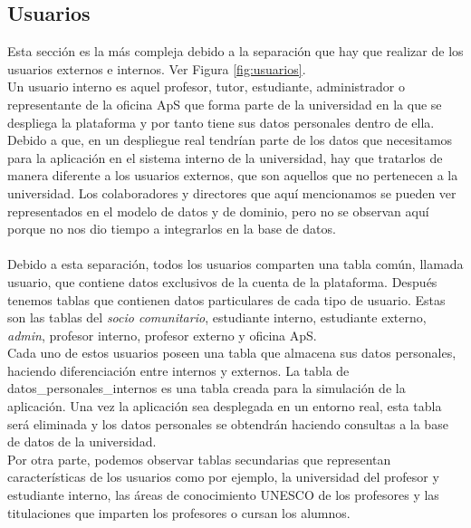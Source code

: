 \documentclass[11pt]{book}
\begin{document}
	\subsection{Usuarios}
	Esta sección es la más compleja debido a la separación que hay que realizar de los usuarios externos e internos. Ver Figura \ref{fig:usuarios}.\\
	Un usuario interno es aquel profesor, tutor, estudiante, administrador o representante de la oficina ApS que forma parte de la universidad en la que se despliega la plataforma y por tanto tiene sus datos personales dentro de ella. Debido a que, en un despliegue real tendrían parte de los datos que necesitamos para la aplicación en el sistema interno de la universidad, hay que tratarlos de manera diferente a los usuarios externos, que son aquellos que no pertenecen a la universidad. Los colaboradores y directores que aquí mencionamos se pueden ver representados en el modelo de datos y de dominio, pero no se observan aquí porque no nos dio tiempo a integrarlos en la base de datos.\\\\
	Debido a esta separación, todos los usuarios comparten una tabla común, llamada usuario, que contiene datos exclusivos de la cuenta de la plataforma. Después tenemos tablas que contienen datos particulares de cada tipo de usuario. Estas son las tablas del \textit{socio comunitario}, estudiante interno, estudiante externo, \textit{admin}, profesor interno, profesor externo y oficina ApS.\\
	Cada uno de estos usuarios poseen una tabla que almacena sus datos personales, haciendo diferenciación entre internos y externos. La tabla de datos\_personales\_internos es una tabla creada para la simulación de la aplicación. Una vez la aplicación sea desplegada en un entorno real, esta tabla será eliminada y los datos personales se obtendrán haciendo consultas a la base de datos de la universidad.\\
	Por otra parte, podemos observar tablas secundarias que representan características de los usuarios como por ejemplo, la universidad del profesor y estudiante interno, las áreas de conocimiento UNESCO de los profesores y las titulaciones que imparten los profesores o cursan los alumnos.
\end{document}

